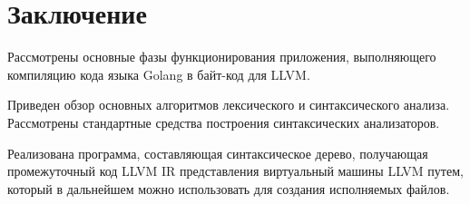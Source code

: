 \section*{Заключение}\label{sec:conclusion}

Рассмотрены основные фазы функционирования приложения, выполняющего компиляцию кода языка Golang в байт-код для LLVM.

Приведен обзор основных алгоритмов лексического и синтаксического анализа.
Рассмотрены стандартные средства построения синтаксических анализаторов.

Реализована программа, составляющая синтаксическое дерево,
получающая промежуточный код LLVM IR представления виртуальный машины LLVM путем, который в дальнейшем можно использовать для
создания исполняемых файлов.
